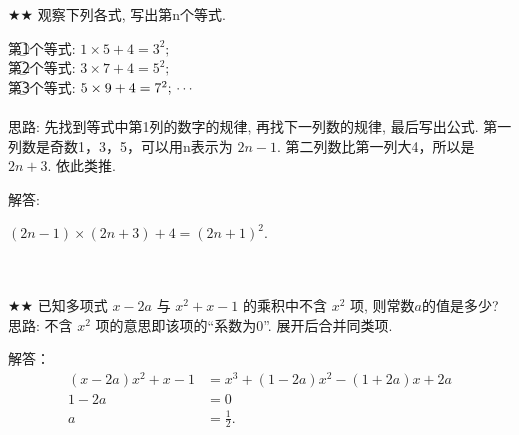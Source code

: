 \begin{comment}
\item {
    计算: $(-xy^2)\cdot (x^2y - 6xy)$
    \\ \\ \\
}

\item {
    计算: $(a+3)(a-1) + a(a-2)$
    \\ \\ \\
}
\end{comment}

\begin{comment}
\item {
    计算(用公式): $(x+2y-1)\cdot (x+2y+1)$
    \\ \\ \\
}
\end{comment}

\item {
    $\bigstar \bigstar$
    观察下列各式, 写出第n个等式. 

    第\textcircled{1}个等式: $1\times 5 + 4 = 3^2;$ \\
    第\textcircled{2}个等式: $3\times 7 + 4 = 5^2;$ \\
    第\textcircled{3}个等式: $5\times 9 + 4 = 7^2; \\ \cdots $ \\
    \ifshowSolution
        \fangsong{}
        \\
        思路: 先找到等式中第1列的数字的规律, 再找下一列数的规律, 最后写出公式. 第一列数是奇数1，3，5，可以用n表示为 $2n-1$. 第二列数比第一列大4，所以是$2n+3$. 依此类推. 

        解答: 

        $(2n-1)\times (2n+3) + 4 = (2n+1)^2$. 
    \else
        \\ \\ \\
    \fi
}

\item {
    $\bigstar \bigstar$
    已知多项式 $x-2a$ 与 $x^2+x-1$ 的乘积中不含 $x^2$ 项, 则常数$a$的值是多少? 
    \ifshowSolution
    \fangsong{}
    \\
    思路: 不含 $x^2$ 项的意思即该项的“系数为0”. 展开后合并同类项. 

    解答：
    \begin{align*}
        (x-2a)x^2+x-1 &= x^3 + (1-2a)x^2-(1+2a)x + 2a\\
        1-2a &= 0 \\
        a &= \frac12. 
    \end{align*}

    \else
        \\ \\ \\
    \fi
}


